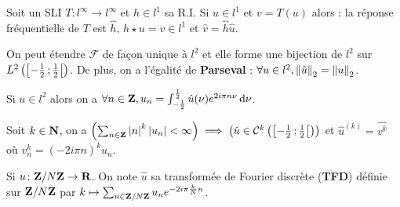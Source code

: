 \begin{pop}
	Soit un SLI $T \colon l^\infty \to l^\infty$ et $h \in l^1$ sa R.I.
	Si $u \in l^1$ et $v = T(u)$ alors : la réponse fréquentielle de $T$ est $\hat{h}$, $h \star u = v \in l^1$ et $\hat{v} = \hat{h} \hat{u}$.
\end{pop}

\begin{thm}
	On peut étendre $\mathcal{F}$ de façon unique à $l^2$ et elle forme une bijection de $l^2$ sur $L^2 \left( \mathopen{}\mathclose{\left[-\frac{1}{2}\mathclose{}\mathpunct{};\frac{1}{2}\right[} \right)$.
	De plus, on a l'égalité de \textbf{Parseval} : $\forall u \in l^2, \left\lVert\hat{u}\right\rVert_2 = \left\lVert u\right\rVert_2$.
\end{thm}

\begin{thm}
	Si $u \in l^2$ alors on a $\forall n \in \mathbf{Z}, u_n = \int_{-\frac{1}{2}}^{\frac{1}{2}} \hat{u}(\nu) e^{2i\pi n\nu} \mathop{}\mathopen{}\mathrm{d} \nu$.
\end{thm}

\begin{thm}
	Soit $k \in \mathbf{N}$, on a $\left( \sum_{n \in \mathbf{Z}} \left\lvert n\right\rvert^k \left\lvert u_n\right\rvert < \infty \right) \implies \left( \hat{u} \in \mathcal{C}^k \left( \mathopen{}\mathclose{\left[-\frac{1}{2}\mathclose{}\mathpunct{};\frac{1}{2}\right[} \right) \right)$ et $\hat{u}^{(k)} = \hat{v^k}$ où $v_n^k = (-2i\pi n)^k u_n$.
\end{thm}

\begin{thm}
	Si $u \colon \mathbf{Z} / N\mathbf{Z} \to \mathbf{R}$.
	On note $\hat{u}$ sa transformée de Fourier discrète (\textbf{TFD}) définie sur $\mathbf{Z} / N\mathbf{Z}$ par $k \mapsto \sum_{n \in \mathbf{Z} / N\mathbf{Z}} u_n e^{-2i\pi \frac{k}{N}n}$.
\end{thm}